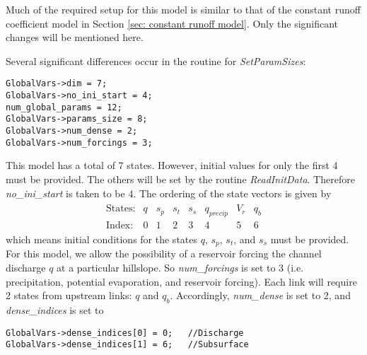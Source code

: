 \documentclass[12pt]{article}
\begin{document}
Much of the required setup for this model is similar to that of the constant runoff coefficient model in Section \ref{sec: constant runoff model}. Only the significant changes will be mentioned here.

Several significant differences occur in the routine for \emph{SetParamSizes}:
\begin{lstlisting}[style=CStyle]
GlobalVars->dim = 7;
GlobalVars->no_ini_start = 4;
num_global_params = 12;
GlobalVars->params_size = 8;
GlobalVars->num_dense = 2;
GlobalVars->num_forcings = 3;
\end{lstlisting}
This model has a total of 7 states. However, initial values for only the first 4 must be provided. The others will be set by the routine \emph{ReadInitData}. Therefore \emph{no\_ini\_start} is taken to be 4. The ordering of the state vectors is given by
\begin{align*}
 \begin{array}{cccccccc}
    \mbox{States:} &  q  &  s_p  & s_t & s_s & q_{precip} & V_r & q_b \\
    \mbox{Index:} & 0 & 1 & 2 & 3 & 4 & 5 & 6 
 \end{array}
\end{align*}
which means initial conditions for the states $q$, $s_p$, $s_t$, and $s_s$ must be provided. For this model, we allow the possibility of a reservoir forcing the channel discharge $q$ at a particular hillslope. So \emph{num\_forcings} is set to 3 (i.e. precipitation, potential evaporation, and reservoir forcing). Each link will require 2 states from upstream links: $q$ and $q_b$. Accordingly, \emph{num\_dense} is set to 2, and \emph{dense\_indices} is set to
\begin{lstlisting}[style=CStyle]
GlobalVars->dense_indices[0] = 0;	//Discharge
GlobalVars->dense_indices[1] = 6;	//Subsurface
\end{lstlisting}
\end{document}
